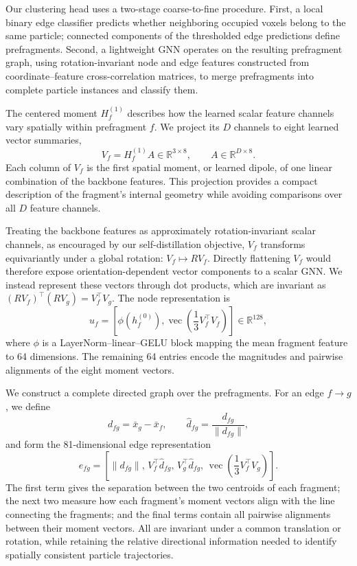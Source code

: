 Our clustering head uses a two-stage coarse-to-fine procedure. First, a local binary edge classifier predicts whether neighboring occupied voxels belong to the same particle; connected components of the thresholded edge predictions define prefragments. Second, a lightweight GNN operates on the resulting prefragment graph, using rotation-invariant node and edge features constructed from coordinate--feature cross-correlation matrices, to merge prefragments into complete particle instances and classify them.

The centered moment $H_f^{(1)}$ describes how the learned scalar feature channels vary spatially within prefragment $f$. We project its $D$ channels to eight learned vector summaries,
\begin{equation}
    V_f = H_f^{(1)}A \in \mathbb{R}^{3\times 8},
    \qquad
    A \in \mathbb{R}^{D\times 8}.
\end{equation}
Each column of $V_f$ is the first spatial moment, or learned dipole, of one linear combination of the backbone features. This projection provides a compact description of the fragment's internal geometry while avoiding comparisons over all $D$ feature channels.

Treating the backbone features as approximately rotation-invariant scalar channels, as encouraged by our self-distillation objective, $V_f$ transforms equivariantly under a global rotation: $V_f\mapsto RV_f$. Directly flattening $V_f$ would therefore expose orientation-dependent vector components to a scalar GNN. We instead represent these vectors through dot products, which are invariant as $(RV_f)^\top(RV_g)=V_f^\top V_g$. The node representation is
\begin{equation}
    u_f =
    \left[
        \phi\!\left(h_f^{(0)}\right),
        \operatorname{vec}\!\left(\frac{1}{3}V_f^\top V_f\right)
    \right]
    \in \mathbb{R}^{128},
\end{equation}
where $\phi$ is a LayerNorm--linear--GELU block mapping the mean fragment feature to 64 dimensions. The remaining 64 entries encode the magnitudes and pairwise alignments of the eight moment vectors.

We construct a complete directed graph over the prefragments. For an edge $f\rightarrow g$, we define
\begin{equation}
    d_{fg}=\bar{x}_g-\bar{x}_f,
    \qquad
    \hat{d}_{fg}=\frac{d_{fg}}{\lVert d_{fg}\rVert},
\end{equation}
and form the 81-dimensional edge representation
\begin{equation}
    e_{fg} =
    \left[
        \lVert d_{fg}\rVert,\,
        V_f^\top\hat{d}_{fg},\,
        V_g^\top\hat{d}_{fg},\,
        \operatorname{vec}\!\left(\frac{1}{3}V_f^\top V_g\right)
    \right].
\end{equation}
The first term gives the separation between the two centroids of each fragment; the next two measure how each fragment’s moment vectors align with the line connecting the fragments; and the final terms contain all pairwise alignments between their moment vectors. All are invariant under a common translation or rotation, while retaining the relative directional information needed to identify spatially consistent particle trajectories. 

